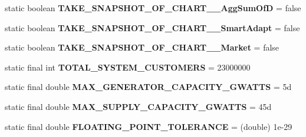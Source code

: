 \begin{DoxyCompactItemize}
\item 
\hypertarget{classuk_1_1ac_1_1dmu_1_1iesd_1_1cascade_1_1base_1_1_consts_a618fe5b4fe36b0397e6cd19ab320598a}{static boolean {\bfseries T\-A\-K\-E\-\_\-\-S\-N\-A\-P\-S\-H\-O\-T\-\_\-\-O\-F\-\_\-\-C\-H\-A\-R\-T\-\_\-\_\-\-Agg\-Sum\-Of\-D} = false}\label{classuk_1_1ac_1_1dmu_1_1iesd_1_1cascade_1_1base_1_1_consts_a618fe5b4fe36b0397e6cd19ab320598a}

\item 
\hypertarget{classuk_1_1ac_1_1dmu_1_1iesd_1_1cascade_1_1base_1_1_consts_a9d2b7cd08dbb2d6a72dd999ee464a8b3}{static boolean {\bfseries T\-A\-K\-E\-\_\-\-S\-N\-A\-P\-S\-H\-O\-T\-\_\-\-O\-F\-\_\-\-C\-H\-A\-R\-T\-\_\-\_\-\-Smart\-Adapt} = false}\label{classuk_1_1ac_1_1dmu_1_1iesd_1_1cascade_1_1base_1_1_consts_a9d2b7cd08dbb2d6a72dd999ee464a8b3}

\item 
\hypertarget{classuk_1_1ac_1_1dmu_1_1iesd_1_1cascade_1_1base_1_1_consts_a82fca0f8704f7ef42d2d13c6c5854c4f}{static boolean {\bfseries T\-A\-K\-E\-\_\-\-S\-N\-A\-P\-S\-H\-O\-T\-\_\-\-O\-F\-\_\-\-C\-H\-A\-R\-T\-\_\-\_\-\-Market} = false}\label{classuk_1_1ac_1_1dmu_1_1iesd_1_1cascade_1_1base_1_1_consts_a82fca0f8704f7ef42d2d13c6c5854c4f}

\item 
\hypertarget{classuk_1_1ac_1_1dmu_1_1iesd_1_1cascade_1_1base_1_1_consts_a629daf59501b95a91f3a4d57cf4f8859}{static final int {\bfseries T\-O\-T\-A\-L\-\_\-\-S\-Y\-S\-T\-E\-M\-\_\-\-C\-U\-S\-T\-O\-M\-E\-R\-S} = 23000000}\label{classuk_1_1ac_1_1dmu_1_1iesd_1_1cascade_1_1base_1_1_consts_a629daf59501b95a91f3a4d57cf4f8859}

\item 
\hypertarget{classuk_1_1ac_1_1dmu_1_1iesd_1_1cascade_1_1base_1_1_consts_aae969a05bc99e45462c50112d7e839bd}{static final double {\bfseries M\-A\-X\-\_\-\-G\-E\-N\-E\-R\-A\-T\-O\-R\-\_\-\-C\-A\-P\-A\-C\-I\-T\-Y\-\_\-\-G\-W\-A\-T\-T\-S} = 5d}\label{classuk_1_1ac_1_1dmu_1_1iesd_1_1cascade_1_1base_1_1_consts_aae969a05bc99e45462c50112d7e839bd}

\item 
\hypertarget{classuk_1_1ac_1_1dmu_1_1iesd_1_1cascade_1_1base_1_1_consts_a6205bed3cf416ddc27c132a6d5b3e0eb}{static final double {\bfseries M\-A\-X\-\_\-\-S\-U\-P\-P\-L\-Y\-\_\-\-C\-A\-P\-A\-C\-I\-T\-Y\-\_\-\-G\-W\-A\-T\-T\-S} = 45d}\label{classuk_1_1ac_1_1dmu_1_1iesd_1_1cascade_1_1base_1_1_consts_a6205bed3cf416ddc27c132a6d5b3e0eb}

\item 
\hypertarget{classuk_1_1ac_1_1dmu_1_1iesd_1_1cascade_1_1base_1_1_consts_a73feffd298de7b31a12ed32d2db5db4f}{static final double {\bfseries F\-L\-O\-A\-T\-I\-N\-G\-\_\-\-P\-O\-I\-N\-T\-\_\-\-T\-O\-L\-E\-R\-A\-N\-C\-E} = (double) 1e-\/29}\label{classuk_1_1ac_1_1dmu_1_1iesd_1_1cascade_1_1base_1_1_consts_a73feffd298de7b31a12ed32d2db5db4f}


\end{DoxyCompactItemize}
